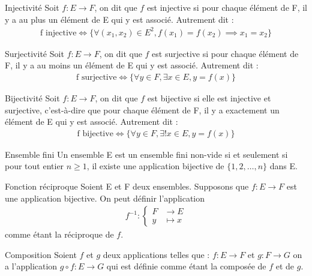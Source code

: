 \begin{definition}{Injectivité}
	Soit $f:E \to F$, on dit que $f$ est injective si pour chaque élément de F, il y a au plus un élément de E qui y est associé. Autrement dit :
	\begin{align*}
		\text{f injective} \iff \{\forall (x_1, x_2) \in E^2, f(x_1) = f(x_2) \implies x_1 = x_2\}
	\end{align*}
\end{definition}

\begin{definition}{Surjectivité}
	Soit $f:E \to F$, on dit que $f$ est surjective si pour chaque élément de F, il y a au moins un élément de E qui y est associé.
	Autrement dit :
	\begin{align*}
		\text{f surjective} \iff \{\forall y \in F, \exists x \in E, y = f(x)\}
	\end{align*}
\end{definition}

\begin{definition}{Bijectivité}
	Soit $f:E \to F$, on dit que $f$ est bijective si elle est injective et surjective, c'est-à-dire que pour chaque élément de F, il y a exactement un élément de E qui y est associé.
	Autrement dit :
	\begin{align*}
		\text{f bijective} \iff \{\forall y \in F, \exists! x \in E, y = f(x)\}
	\end{align*}
\end{definition}

\begin{definition}{Ensemble fini}
    Un ensemble E est un ensemble fini non-vide si et seulement si pour tout entier $n \geq 1$, il existe une application bijective de $\{1, 2, \ldots, n\}$ dans E.
\end{definition}

\begin{definition}{Fonction réciproque}
	Soient E et F deux ensembles. Supposons que $f:E \to F$ est une application bijective. On peut définir l'application 
	\begin{align*}
		f^{-1} : 
		\begin{cases}
			F &\to E \\
			y &\mapsto x
		\end{cases}
	\end{align*}
	comme étant la réciproque de $f$.
\end{definition}

\begin{definition}{Composition}
	Soient $f$ et $g$ deux applications telles que :
	$f:E \to F$ et $g:F \to G$ on a l'application $g \circ f : E \to G$ qui est définie comme étant la composée de $f$ et de $g$.
\end{definition}

